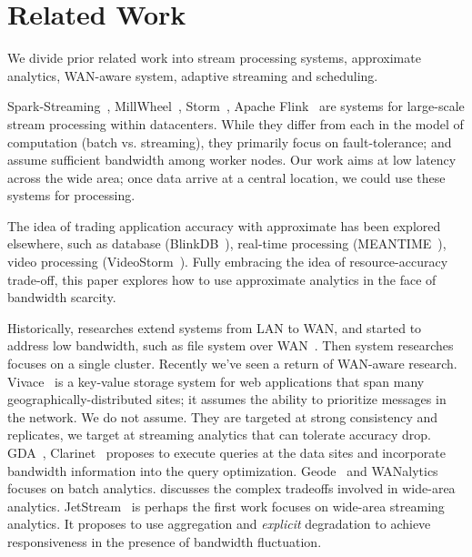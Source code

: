 \section{Related Work}
\label{sec:related-work}

We divide prior related work into stream processing systems, approximate
analytics, WAN-aware system, adaptive streaming and scheduling.

Spark-Streaming~\cite{zaharia2013discretized},
MillWheel~\cite{akidau2013millwheel}, Storm~\cite{toshniwal2014storm}, Apache
Flink~\cite{carbone2015apache} are systems for large-scale stream processing
within datacenters. While they differ from each in the model of computation
(batch vs. streaming), they primarily focus on fault-tolerance; and assume
sufficient bandwidth among worker nodes. Our work aims at low latency across the
wide area; once data arrive at a central location, we could use these systems
for processing.

 The idea of trading application accuracy with
approximate has been explored elsewhere, such as database
(BlinkDB~\cite{agarwal2013blinkdb}), real-time processing
(MEANTIME~\cite{farrell2016meantime}), video processing
(VideoStorm~\cite{zhang2017live}). Fully embracing the idea of resource-accuracy
trade-off, this paper explores how to use approximate analytics in the face of
bandwidth scarcity.

 Historically, researches extend systems from LAN to WAN, and
started to address low bandwidth, such as file system over
WAN~\cite{muthitacharoen2001low}. Then system researches focuses on a single
cluster.  Recently we've seen a return of WAN-aware
research. Vivace~\cite{cho2012surviving} is a key-value storage system for web
applications that span many geographically-distributed sites; it assumes the
ability to prioritize messages in the network. We do not assume. They are
targeted at strong consistency and replicates, we target at streaming analytics
that can tolerate accuracy drop. GDA~\cite{pu2015low},
Clarinet~\cite{viswanathan2016clarinet} proposes to execute queries at the data
sites and incorporate bandwidth information into the query
optimization. Geode~\cite{vulimiri2015global} and
WANalytics~\cite{wanalytics2015vulimiri} focuses on batch analytics.
\cite{heintz2015towards} discusses the complex tradeoffs involved in wide-area
analytics. JetStream~\cite{rabkin2014aggregation} is perhaps the first work
focuses on wide-area streaming analytics. It proposes to use aggregation and
\textit{explicit} degradation to achieve responsiveness in the presence of
bandwidth fluctuation.

